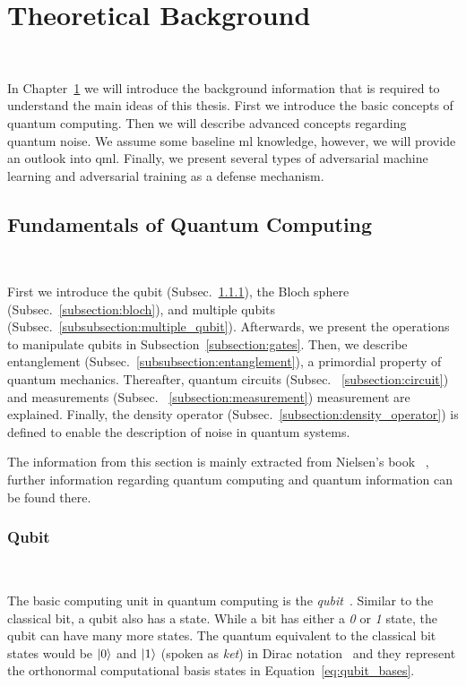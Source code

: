 \chapter{Theoretical Background}\label{chapter:background} \

In Chapter~\ref{chapter:background} we will introduce the
background information that is required to understand
the main ideas of this thesis. First we introduce
the basic concepts of quantum computing. Then we will
describe advanced concepts regarding quantum noise. We
assume some baseline \ac{ml} knowledge, however, we
will provide an outlook into \ac{qml}. Finally, we
present several types of adversarial machine learning
and adversarial training as a defense mechanism. \

\section{Fundamentals of Quantum Computing} \

First we introduce the qubit (Subsec.~\ref{subsection:qubit}),
the Bloch sphere (Subsec.~\ref{subsection:bloch}), and
multiple qubits (Subsec.~\ref{subsubsection:multiple_qubit}).
Afterwards, we present the operations to manipulate qubits in 
Subsection~\ref{subsection:gates}. Then, we describe entanglement
(Subsec.~\ref{subsubsection:entanglement}), a primordial
property of quantum mechanics. Thereafter, quantum circuits (Subsec.
~\ref{subsection:circuit}) and measurements (Subsec.
~\ref{subsection:measurement}) measurement are explained.
Finally, the density operator (Subsec.~\ref{subsection:density_operator})
is defined to enable the description of noise in quantum systems. \

The information from this section is mainly extracted from
Nielsen's book ~\cite{nielsen_quantum_2010}, further information
regarding quantum computing and quantum information can be found
there. \

\subsection{Qubit}\label{subsection:qubit} \

The basic computing unit in quantum computing is the
\textit{qubit}~\cite{schumacher_quantum_1995}. Similar to the classical
bit, a qubit also has a state. While a bit has either a
\textit{0} or \textit{1} state, the qubit can have
many more states. The quantum equivalent to the classical
bit states would be \(\ket{0}\) and \(\ket{1}\) (spoken as \textit{ket}) in Dirac
notation~\cite{dirac_new_1939} and they represent the orthonormal computational
basis states in Equation~\ref{eq:qubit_bases}. \

